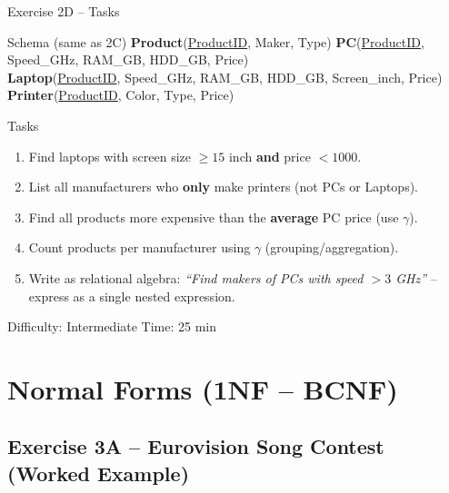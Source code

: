 \documentclass[10pt]{beamer}
\begin{document}
\begin{frame}{Exercise 2D -- Tasks}
  \begin{block}{Schema (same as 2C)}
    \textbf{Product}(\underline{ProductID}, Maker, Type) \quad
    \textbf{PC}(\underline{ProductID}, Speed\_GHz, RAM\_GB, HDD\_GB, Price)\\
    \textbf{Laptop}(\underline{ProductID}, Speed\_GHz, RAM\_GB, HDD\_GB, Screen\_inch, Price)\\
    \textbf{Printer}(\underline{ProductID}, Color, Type, Price)
  \end{block}

  \begin{block}{Tasks}
    \begin{enumerate}
      \item Find laptops with screen size $\geq 15$ inch \textbf{and} price $< 1000$.
      \item List all manufacturers who \textbf{only} make printers (not PCs or Laptops).
      \item Find all products more expensive than the \textbf{average} PC price (use $\gamma$).
      \item Count products per manufacturer using $\gamma$ (grouping/aggregation).
      \item Write as relational algebra: \emph{``Find makers of PCs with speed $> 3$ GHz''} -- express as a single nested expression.
    \end{enumerate}
  \end{block}

  \begin{alertblock}{Difficulty: Intermediate \quad Time: 25 min}
  \end{alertblock}
\end{frame}

\section{Normal Forms (1NF -- BCNF)}

\subsection{Exercise 3A -- Eurovision Song Contest (Worked Example)}
\end{document}
